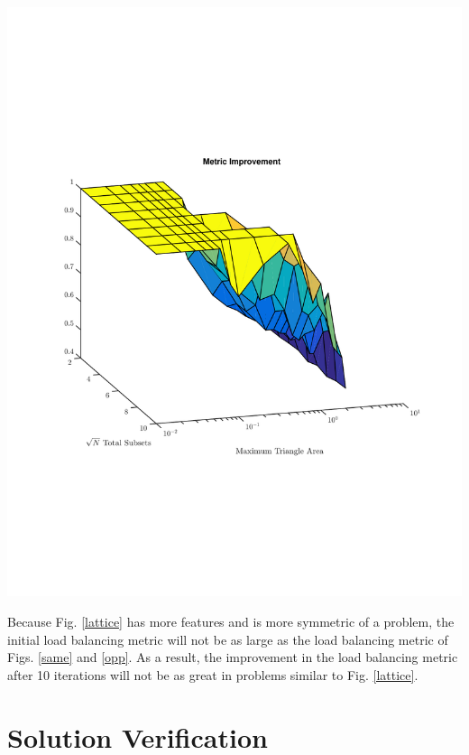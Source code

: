 \noindent\begin{minipage}{\textwidth}
\centering
\includegraphics[scale=0.80, trim = 2cm 6cm 2cm 7cm,clip]{figures/lattice_diff.pdf}
\label{latticediff}
\end{minipage}
\smallskip

Because Fig. \ref{lattice} has more features and is more symmetric of a problem, the initial load balancing metric will not be as large as the load balancing metric of Figs. \ref{same} and \ref{opp}. As a result, the improvement in the load balancing metric after 10 iterations will not be as great in problems similar to Fig. \ref{lattice}. 

\section{Solution Verification}

